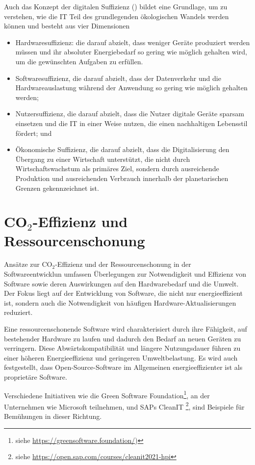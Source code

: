 \documentclass{article}
\begin{document}
Auch das Konzept der digitalen Suffizienz (\cite{santarius_digital_2023}) bildet eine Grundlage, um zu verstehen, wie die IT Teil des grundlegenden ökologischen Wandels werden können und besteht aus vier Dimensionen 
\begin{itemize}
	\item Hardwaresuffizienz: die darauf abzielt, dass weniger Geräte produziert werden müssen und ihr absoluter Energiebedarf so gering wie möglich gehalten wird, um die gewünschten Aufgaben zu erfüllen.
  \item  Softwaresuffizienz, die darauf abzielt, dass der Datenverkehr und die Hardwareauslastung während der Anwendung so gering wie möglich gehalten werden; 
 \item Nutzersuffizienz, die darauf abzielt, dass die Nutzer digitale Geräte sparsam einsetzen und die IT in einer Weise nutzen, die einen nachhaltigen Lebensstil fördert; und 
\item Ökonomische Suffizienz, die darauf abzielt, dass die Digitalisierung den Übergang zu einer Wirtschaft unterstützt, die nicht durch Wirtschaftswachstum als primäres Ziel, sondern durch ausreichende Produktion und ausreichenden Verbrauch innerhalb der planetarischen Grenzen gekennzeichnet ist. 
\end{itemize}




\section{CO$_2$-Effizienz und Ressourcenschonung}

Ansätze zur CO$_2$-Effizienz und der Ressourcenschonung in der Softwareentwicklun umfassen Überlegungen zur Notwendigkeit und Effizienz von Software sowie deren Auswirkungen auf den Hardwarebedarf und die Umwelt. Der Fokus liegt auf der Entwicklung von Software, die nicht nur energieeffizient ist, sondern auch die Notwendigkeit von häufigen Hardware-Aktualisierungen reduziert.

Eine ressourcenschonende Software wird charakterisiert durch ihre Fähigkeit, auf bestehender Hardware zu laufen und dadurch den Bedarf an neuen Geräten zu verringern. Diese Abwärtskompatibilität und längere Nutzungsdauer führen zu einer höheren Energieeffizienz und geringeren Umweltbelastung. Es wird auch festgestellt, dass Open-Source-Software im Allgemeinen energieeffizienter ist als proprietäre Software.

Verschiedene Initiativen wie die Green Software Foundation\footnote{%
             siehe \href{https://greensoftware.foundation/}{https://greensoftware.foundation/})},%
an der Unternehmen wie Microsoft teilnehmen, und SAPs CleanIT \footnote{%
       siehe \href{https://open.sap.com/courses/cleanit2021-hpi}{https://open.sap.com/courses/cleanit2021-hpi}}, %
sind Beispiele für Bemühungen in dieser Richtung. 
\end{document}
